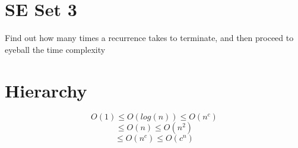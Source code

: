 \documentclass[fontsize=10pt,a4paper]{article}
\begin{document}
\begin{multicols}{3}
\begin{itemize}
    \end{itemize}


    \section{SE Set 3}
    Find out how many times a recurrence takes to terminate, and then proceed to eyeball the time complexity

    \section{Hierarchy}
    $$O(1) \leqslant O(log(n)) \leqslant O(n^c)$$ 
    $$\leqslant O(n) \leqslant O(n^2)$$ 
    $$\leqslant O(n^c) \leqslant O(c^n)$$









\end{multicols}
\end{document}
